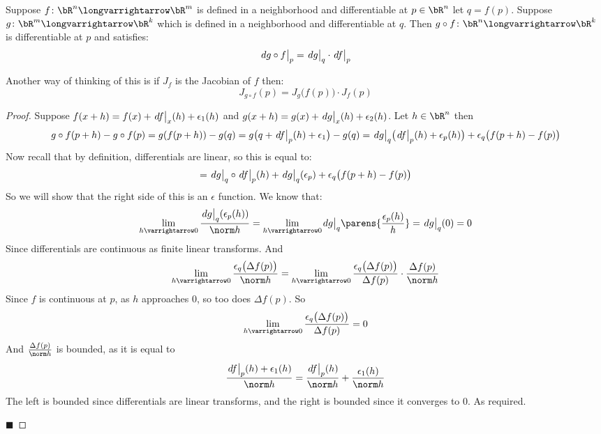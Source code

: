 \documentclass[10pt]{article}
\def\differ#1#2{\left.d#1\strut\right|_{#2}}
\begin{document}


\bigskip

\begin{prop*}

    Suppose $f\colon\bR^n\longvarrightarrow\bR^m$ is defined in a neighborhood and differentiable at $p\in\bR^n$ let $q=f(p)$.
    Suppose $g\colon\bR^m\longvarrightarrow\bR^k$ which is defined in a neighborhood and differentiable at $q$.
    Then $g\circ f\colon\bR^n\longvarrightarrow\bR^k$ is differentiable at $p$ and satisfies:
    \[ \differ{g\circ f}p = \differ gq\cdot\differ fp \]

\end{prop*}

Another way of thinking of this is if $J_f$ is the Jacobian of $f$ then:
\[ J_{g\circ f}(p) = J_g\bigl(f(p)\bigr)\cdot J_f(p) \]

\begin{proof}

    Suppose $f(x+h)=f(x)+\differ fx(h)+\epsilon_1(h)$ and $g(x+h)=g(x)+\differ gx(h)+\epsilon_2(h)$.
    Let $h\in\bR^n$ then
    \[ g\circ f(p+h) - g\circ f(p) = g(f(p+h))-g(q) = g\bigl(q+\differ fp(h)+\epsilon_1\bigr)-g(q) = \differ gq\bigl(\differ fp(h)+\epsilon_p(h)\bigr) + \epsilon_q\bigl(f(p+h)-f(p)\bigr) \]
    Now recall that by definition, differentials are linear, so this is equal to:
    \[ = \differ gq\circ\differ fp(h) + \differ gq(\epsilon_p) + \epsilon_q\bigl(f(p+h)-f(p)\bigr) \]
    So we will show that the right side of this is an $\epsilon$ function.
    We know that:
    \[ \lim_{h\varrightarrow0}\frac{\differ gq(\epsilon_p(h))}{\norm h} = \lim_{h\varrightarrow0}\differ gq\parens{\frac{\epsilon_p(h)}h} = \differ gq(0) = 0 \]
    Since differentials are continuous as finite linear transforms.
    And
    \[ \lim_{h\varrightarrow0}\frac{\epsilon_q\bigl(\Delta f(p)\bigr)}{\norm h} = \lim_{h\varrightarrow0}\frac{\epsilon_q\bigl(\Delta f(p)\bigr)}{\Delta f(p)}\cdot\frac{\Delta f(p)}{\norm h} \]
    Since $f$ is continuous at $p$, as $h$ approaches $0$, so too does $\Delta f(p)$.
    So
    \[ \lim_{h\varrightarrow0}\frac{\epsilon_q\bigl(\Delta f(p)\bigr)}{\Delta f(p)} = 0 \]
    And $\frac{\Delta f(p)}{\norm h}$ is bounded, as it is equal to
    \[ \frac{\differ fp(h)+\epsilon_1(h)}{\norm h} = \frac{\differ fp(h)}{\norm h} + \frac{\epsilon_1(h)}{\norm h} \]
    The left is bounded since differentials are linear transforms, and the right is bounded since it converges to $0$.
    As required.

    \hfill$\blacksquare$

\end{proof}
\end{document}
